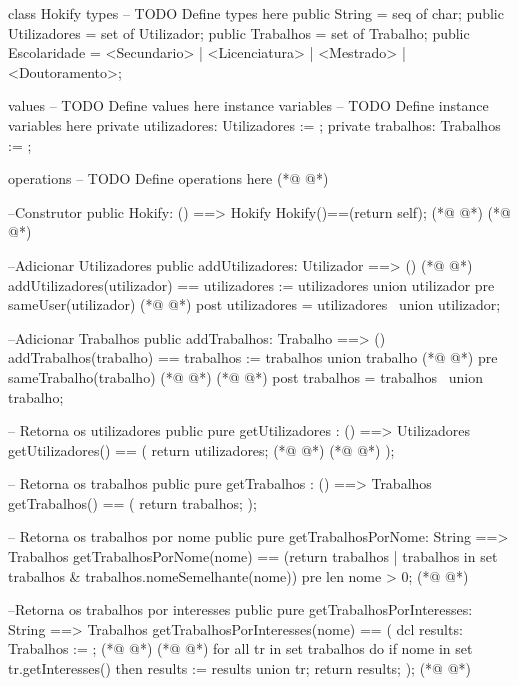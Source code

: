 \begin{vdmpp}[breaklines=true]
class Hokify
types
-- TODO Define types here
 public String = seq of char;
 public Utilizadores = set of Utilizador;
 public Trabalhos = set of Trabalho;
 public Escolaridade = <Secundario> | <Licenciatura> | <Mestrado> | <Doutoramento>;
 
values
-- TODO Define values here
instance variables
-- TODO Define instance variables here
 private utilizadores: Utilizadores := {};
 private trabalhos: Trabalhos := {};
 
operations
-- TODO Define operations here
(*@
\label{Hokify:18}
@*)
 
 --Construtor
 public Hokify: () ==> Hokify
 Hokify()==(return self);
(*@
\label{addUtilizadores:22}
@*)
(*@
\label{addSkills:22}
@*)
 
 
 --Adicionar Utilizadores
 public addUtilizadores: Utilizador ==> ()
(*@
\label{mapEscolaridades:26}
@*)
 addUtilizadores(utilizador) == utilizadores := utilizadores union {utilizador}
 pre sameUser(utilizador)
(*@
\label{addTrabalhos:28}
@*)
 post utilizadores = utilizadores~ union {utilizador};
 
 --Adicionar Trabalhos
 public addTrabalhos: Trabalho ==> ()
 addTrabalhos(trabalho) == trabalhos := trabalhos union {trabalho}
(*@
\label{sameUser:33}
@*)
 pre sameTrabalho(trabalho)
(*@
\label{getSkills:34}
@*)
(*@
\label{getUtilizadores:34}
@*)
 post trabalhos = trabalhos~ union {trabalho};
 
 -- Retorna os utilizadores
 public pure getUtilizadores : () ==> Utilizadores
 getUtilizadores() ==
 (
  return utilizadores;
(*@
\label{sameTrabalho:41}
@*)
(*@
\label{getTrabalhos:41}
@*)
 );
 
 -- Retorna os trabalhos
 public pure getTrabalhos : () ==> Trabalhos
 getTrabalhos() ==
 (
  return trabalhos;
 );
 
 -- Retorna os trabalhos por nome
 public pure getTrabalhosPorNome: String ==> Trabalhos
 getTrabalhosPorNome(nome) == (return {trabalhos | trabalhos in set trabalhos & trabalhos.nomeSemelhante(nome)})
 pre len nome > 0;
(*@
\label{getTrabalhosPorInteresses:54}
@*)
 
 --Retorna os trabalhos por interesses
 public pure getTrabalhosPorInteresses: String ==> Trabalhos
 getTrabalhosPorInteresses(nome) == (
  dcl results: Trabalhos := {};
(*@
\label{searchByName:59}
@*)
(*@
\label{getTrabalhosPorNome:59}
@*)
  for all tr in set trabalhos do
   if nome in set tr.getInteresses() then
    results := results union {tr};
  return results;
 );
(*@
\label{getTrabalhosPorSkills:64}
@*)
 

\end{vdmpp}
